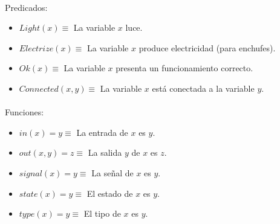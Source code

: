 \documentclass[10pt, a4paper,spanish]{article}
\begin{document}
		\paragraph{}
		Predicados:

		\begin{itemize}
			\item $Light(x) \equiv$ La variable $x$ luce.
			\item $Electrize(x) \equiv$ La variable $x$ produce electricidad (para enchufes).
			\item $Ok(x) \equiv$ La variable $x$ presenta un funcionamiento correcto.
			\item $Connected(x, y) \equiv$ La variable $x$ está conectada a la variable $y$.
		\end{itemize}


		\paragraph{}
		Funciones:
		\begin{itemize}
			\item $in(x) = y \equiv$ La entrada de $x$ es $y$.
			\item $out(x,y) = z \equiv$ La salida $y$ de $x$ es  $z$.
			\item $signal(x) = y \equiv$ La señal de $x$ es  $y $.
			\item $state(x) = y \equiv$ El estado de $x$ es $y$.
			\item $type(x) = y \equiv$ El tipo de $x$ es $y$.
		\end{itemize}
\end{document}
